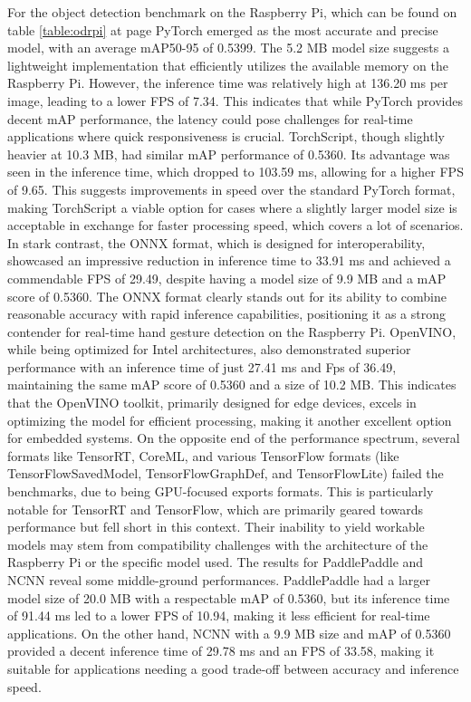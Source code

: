 \documentclass[12pt]{article}
\begin{document}
For the object detection benchmark on the Raspberry Pi, which can be found on table \ref{table:odrpi} at page \pageref{table:odrpi} PyTorch emerged as the most accurate and precise model, with an average mAP50-95 of 0.5399. The 5.2 MB model size suggests a lightweight implementation that efficiently utilizes the available memory on the Raspberry Pi. However, the inference time was relatively high at 136.20 ms per image, leading to a lower FPS of 7.34. This indicates that while PyTorch provides decent mAP performance, the latency could pose challenges for real-time applications where quick responsiveness is crucial.
TorchScript, though slightly heavier at 10.3 MB, had similar mAP performance of 0.5360. Its advantage was seen in the inference time, which dropped to 103.59 ms, allowing for a higher FPS of 9.65. This suggests improvements in speed over the standard PyTorch format, making TorchScript a viable option for cases where a slightly larger model size is acceptable in exchange for faster processing speed, which covers a lot of scenarios.
In stark contrast, the ONNX format, which is designed for interoperability, showcased an impressive reduction in inference time to 33.91 ms and achieved a commendable FPS of 29.49, despite having a model size of 9.9 MB and a mAP score of 0.5360. The ONNX format clearly stands out for its ability to combine reasonable accuracy with rapid inference capabilities, positioning it as a strong contender for real-time hand gesture detection on the Raspberry Pi.
OpenVINO, while being optimized for Intel architectures, also demonstrated superior performance with an inference time of just 27.41 ms and Fps of 36.49, maintaining the same mAP score of 0.5360 and a size of 10.2 MB. This indicates that the OpenVINO toolkit, primarily designed for edge devices, excels in optimizing the model for efficient processing, making it another excellent option for embedded systems.
On the opposite end of the performance spectrum, several formats like TensorRT, CoreML, and various TensorFlow formats (like TensorFlowSavedModel, TensorFlowGraphDef, and TensorFlowLite) failed the benchmarks, due to being GPU-focused exports formats. This is particularly notable for TensorRT and TensorFlow, which are primarily geared towards performance but fell short in this context. Their inability to yield workable models may stem from compatibility challenges with the architecture of the Raspberry Pi or the specific model used.
The results for PaddlePaddle and NCNN reveal some middle-ground performances. PaddlePaddle had a larger model size of 20.0 MB with a respectable mAP of 0.5360, but its inference time of 91.44 ms led to a lower FPS of 10.94, making it less efficient for real-time applications. On the other hand, NCNN with a 9.9 MB size and mAP of 0.5360 provided a decent inference time of 29.78 ms and an FPS of 33.58, making it suitable for applications needing a good trade-off between accuracy and inference speed.
\end{document}
